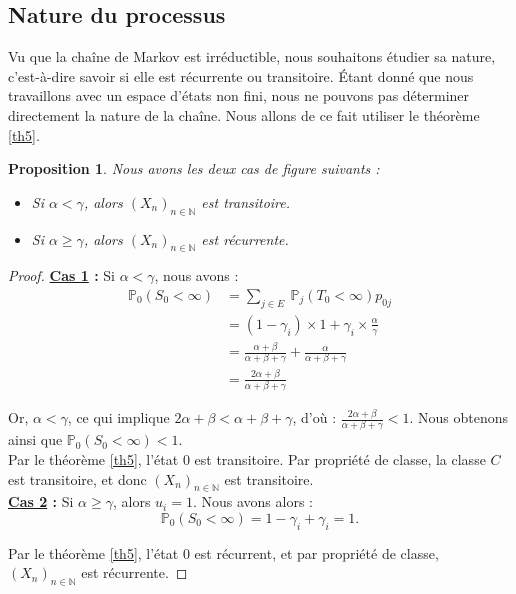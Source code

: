 \documentclass[12pt,a4paper]{report}
\newtheorem{prop}[thm]{Proposition}
\theoremstyle{remark}
\begin{document}
\subsection{Nature du processus}
\vspace{0.6cm}

Vu que la chaîne de Markov est irréductible, nous souhaitons étudier sa nature, c'est-à-dire savoir si elle est récurrente ou transitoire. Étant donné que nous travaillons avec un espace d'états non fini, nous ne pouvons pas déterminer directement la nature de la chaîne. Nous allons de ce fait utiliser le théorème \ref{th5}.

\begin{prop}
Nous avons les deux cas de figure suivants :
\begin{itemize}
    \item Si $\alpha < \gamma$, alors $(X_n)_{n \in \mathbb{N}}$ est transitoire.
    \item Si $\alpha \geqslant \gamma$, alors $(X_n)_{n \in \mathbb{N}}$ est récurrente.
\end{itemize}
\end{prop}
\begin{proof}
\textbf{\underline{Cas 1} :} Si $\alpha<\gamma$, nous avons :
\begin{align*}
\mathbb{P}_0(S_0 < \infty) &= \sum_{j\in E}{\ \mathbb{P}_j(T_0 < \infty)p_{0j}} \\
&= (1-\gamma_{i}) \times 1 + \gamma_{i} \times \frac{\alpha}{\gamma} \\
&=\frac{\alpha+\beta}{\alpha+\beta+\gamma}+\frac{\alpha}{\alpha+\beta+\gamma} \\
&= \frac{2\alpha+\beta}{\alpha+\beta+\gamma}
\end{align*}

Or, $\alpha < \gamma$, ce qui implique $2\alpha + \beta < \alpha + \beta + \gamma$, d'où : $\frac{2\alpha+\beta}{\alpha+\beta+\gamma} < 1$. Nous obtenons ainsi que $\mathbb{P}_0(S_0 < \infty) < 1$. \\
Par le théorème \ref{th5}, l'état $0$ est transitoire. Par propriété  de classe, la classe $C$ est transitoire, et donc $(X_n)_{n \in \mathbb{N}}$ est transitoire.\\

\textbf{\underline{Cas 2} :} Si $\alpha \geqslant \gamma$, alors $u_i=1$. Nous avons alors :
$$\mathbb{P}_0(S_0 < \infty)=
 1-\gamma_i+\gamma_i=1.$$

Par le théorème \ref{th5}, l'état $0$ est récurrent, et par propriété de classe, $(X_n)_{n \in \mathbb{N}}$ est récurrente.
\end{proof}
\end{document}

